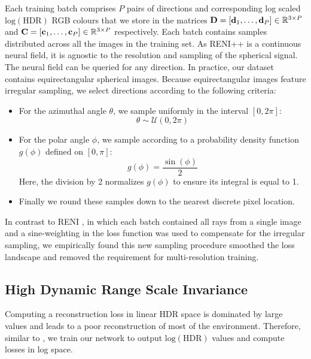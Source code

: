 Each training batch comprises $P$ pairs of directions and corresponding log scaled $\text{log}(\text{HDR})$ RGB colours that we store in the matrices $\mathbf{D}=[\mathbf{d}_{1},\dots,\mathbf{d}_{P}]\in{\mathbb{R}}^{3\times P}$ and $\mathbf{C}=[\mathbf{c}_{1},\dots,\mathbf{c}_{P}]\in{\mathbb{R}}^{3\times P}$ respectively. Each batch contains samples distributed across all the images in the training set. As RENI++ is a continuous neural field, it is agnostic to the resolution and sampling of the spherical signal. The neural field can be queried for any direction. In practice, our dataset contains equirectangular spherical images. Because equirectangular images feature irregular sampling, we select directions according to the following criteria:
\begin{itemize}
    \item For the azimuthal angle \( \theta \), we sample uniformly in the interval \( [0, 2\pi] \):
\[
\theta \sim \mathcal{U}(0, 2\pi)
\]
\item For the polar angle \( \phi \), we sample according to a probability density function \( g(\phi) \) defined on \( [0, \pi] \):
\[
g(\phi) = \frac{\sin(\phi)}{2}
\]
Here, the division by 2 normalizes \( g(\phi) \) to ensure its integral is equal to 1.
\item Finally we round these samples down to the nearest discrete pixel location.
\end{itemize}
In contrast to RENI \cite{gardner2022rotation}, in which each batch contained all rays from a single image and a sine-weighting in the loss function was used to compensate for the irregular sampling, we empirically found this new sampling procedure smoothed the loss landscape and removed the requirement for multi-resolution training.

\subsection{High Dynamic Range Scale Invariance}
Computing a reconstruction loss in linear HDR space is dominated by large values and leads to a poor reconstruction of most of the environment. Therefore, similar to \cite{eilertsen_hdr_2017}, we train our network to output $\text{log}(\text{HDR})$ values and compute losses in log space. 

